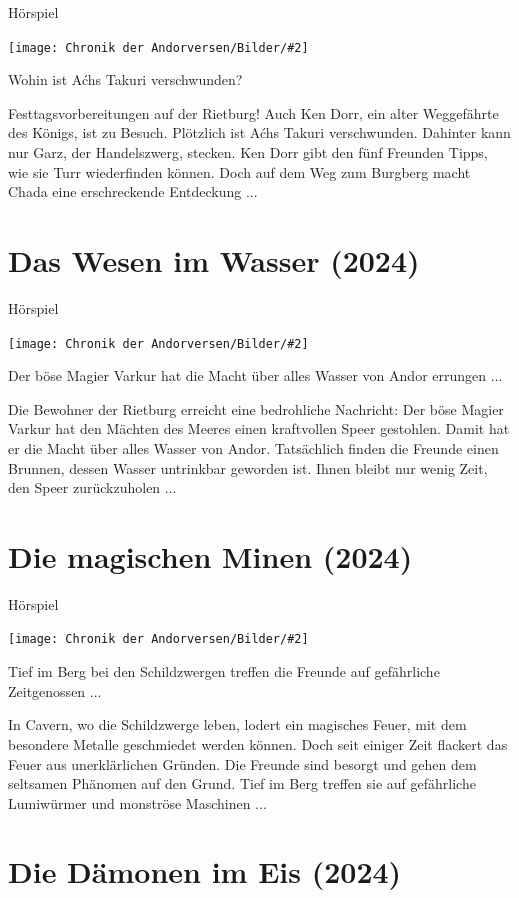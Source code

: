 \documentclass[10pt, a4paper, oneside]{book}
\newcommand{\fillbreak}{\vspace*{\fill}\columnbreak}
\newcommand{\produkt}[1]{%
    \section{#1}%
    \label{Produkt: #1}%
}
\newcommand{\bildmitts}[2][height=0.32\textwidth,width=0.48\textwidth,keepaspectratio]{%
    \begin{center}
        \texttt{[image: Chronik der Andorversen/Bilder/\#2]}
    \end{center}
}
\begin{document}
\begin{multicols}{2}
\begin{center}
    Hörspiel
\end{center}

\bildmitts{Die Spur aus der Vergangenheit (2024).jpeg}

Wohin ist Aćhs Takuri verschwunden?

Festtagsvorbereitungen auf der Rietburg! Auch Ken Dorr, ein alter Weggefährte des Königs, ist zu Besuch. Plötzlich ist Aćhs Takuri verschwunden. Dahinter kann nur Garz, der Handelszwerg, stecken. Ken Dorr gibt den fünf Freunden Tipps, wie sie Turr wiederfinden können. Doch auf dem Weg zum Burgberg macht Chada eine erschreckende Entdeckung ...




\fillbreak
\produkt{Das Wesen im Wasser (2024)}

\begin{center}
    Hörspiel
\end{center}

\bildmitts{Das Wesen im Wasser (2024).jpeg}

Der böse Magier Varkur hat die Macht über alles Wasser von Andor errungen ...

Die Bewohner der Rietburg erreicht eine bedrohliche Nachricht: Der böse Magier Varkur hat den Mächten des Meeres einen kraftvollen Speer gestohlen. Damit hat er die Macht über alles Wasser von Andor. Tatsächlich finden die Freunde einen Brunnen, dessen Wasser untrinkbar geworden ist. Ihnen bleibt nur wenig Zeit, den Speer zurückzuholen ...








\produkt{Die magischen Minen (2024)}

\begin{center}
    Hörspiel
\end{center}

\bildmitts{Die magischen Minen (2024).jpeg}


Tief im Berg bei den Schildzwergen treffen die Freunde auf gefährliche Zeitgenossen ...

In Cavern, wo die Schildzwerge leben, lodert ein magisches Feuer, mit dem besondere Metalle geschmiedet werden können. Doch seit einiger Zeit flackert das Feuer aus unerklärlichen Gründen. Die Freunde sind besorgt und gehen dem seltsamen Phänomen auf den Grund. Tief im Berg treffen sie auf gefährliche Lumiwürmer und monströse Maschinen ...


\fillbreak
\produkt{Die Dämonen im Eis (2024)}


\end{multicols}
\end{document}
